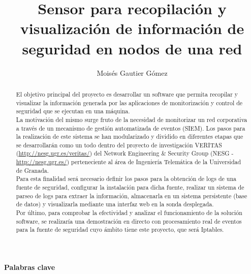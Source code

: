 \documentclass{article}
\begin{document}
\title{Sensor para recopilación y visualización de información de seguridad en nodos de una red}
\author{Moisés Gautier Gómez}
\date{ }
\maketitle
\begin{center}
\small{\textbf{Palabras clave}}
\end{center}
\begin{abstract}
El objetivo principal del proyecto es desarrollar un software que permita recopilar y visualizar la información generada por las aplicaciones de monitorización y control de seguridad que se ejecutan en una máquina.\\

La motivación del mismo surge fruto de la necesidad de monitorizar un red corporativa a través de un mecanismo de gestión automatizada de eventos (SIEM). Los pasos para la realización de este sistema se han modularizado y dividido en diferentes etapas que se desarrollarán como un todo dentro del proyecto de investigación VERITAS (\url{http://nesg.ugr.es/veritas/}) del Network Engineering \& Security Group (NESG - \url{http://nesg.ugr.es/}) perteneciente al área de Ingeniería Telemática de la Universidad de Granada.\\

Para esta finalidad será necesario definir los pasos para la obtención de logs de una fuente de seguridad, configurar la instalación para dicha fuente, realizar un sistema de parseo de logs para extraer la información, almacenarla en un sistema persistente (base de datos) y visualizarla mediante una interfaz web en la sonda desplegada.\\

Por último, para comprobar la efectividad y analizar el funcionamiento de la solución software, se realizaría una demostración en directo con procesamiento real de eventos para la fuente de seguridad cuyo ámbito tiene este proyecto, que será Iptables. \\

\end{abstract}
\end{document}
